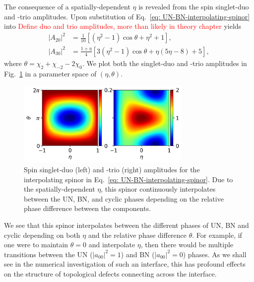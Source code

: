The consequence of a spatially-dependent \(\eta \) is revealed from the spin
singlet-duo and -trio amplitudes.
Upon substitution of Eq.~\eqref{eq: UN-BN-interpolating-spinor} into
\textcolor{red}{Define duo and trio amplitudes, more than likely in theory
    chapter} yields
\begin{equation}
    \begin{aligned}
        |A_{20}|^2 & = \frac{1}{10} \left[(\eta^2-1)\cos\theta
        + \eta^2 + 1\right],                                          \\
        |A_{30}|^2 & = \frac{1+\eta}{4} \left[3\left(\eta ^2-1\right)
            \cos\theta
            + \eta(5 \eta -8) + 5\right],
    \end{aligned}
\end{equation}
where \(\theta = \chi_2 + \chi_{-2} - 2\chi_0\).
We plot both the singlet-duo and -trio amplitudes in
Fig.~\ref{fig: UN-BN-duo-trio} in a parameter space of \((\eta, \theta)\).
\begin{figure}
    \centering
    \includegraphics[width=0.75\textwidth]{gfx/ch-spin2/a20-a30-varying.png}
    \caption{\label{fig: UN-BN-duo-trio} Spin singlet-duo (left) and -trio
        (right) amplitudes for the interpolating spinor in
        Eq.~\eqref{eq: UN-BN-interpolating-spinor}.
        Due to the spatially-dependent \(\eta \), this spinor continuously
        interpolates between the UN, BN, and cyclic phases depending on the
        relative phase difference between the components.}
\end{figure}
We see that this spinor interpolates between the different phases of UN, BN and
cyclic depending on both \(\eta \) and the relative phase difference
\(\theta \).
For example, if one were to maintain \(\theta=0\) and interpolate \(\eta \),
then there would be multiple transitions between the UN (\(|a_{00}|^2 = 1\)) and
BN (\(|a_{00}|^2 = 0\)) phases.
As we shall see in the numerical investigation of such an interface, this has
profound effects on the structure of topological defects connecting across
the interface.

